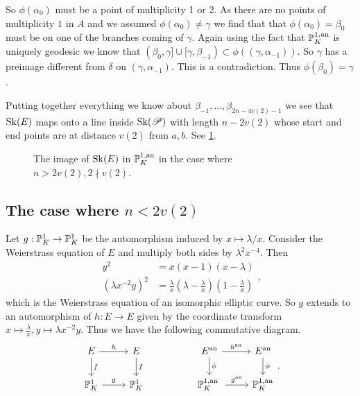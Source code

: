 So $\phi(\alpha_0)$ must be a point of multiplicity 1 or 2. As there are no points of multiplicity $1$ in $A$ and we assumed $\phi(\alpha_0)\ne \gamma$ we find that that $\phi(\alpha_0) = \beta_0$ must be on one of the branches coming of $\gamma$. 
Again using the fact that $\mathbb{P}^{1, \text{an}}_K$ is uniquely geodesic we know that $(\beta_0, \gamma] \cup [\gamma, \beta_{-1}) \subset  \phi((\gamma, \alpha_{-1}))$. 
So $\gamma$ has a preimage different from $\delta$ on $(\gamma, \alpha_{-1})$. 
This is a contradiction. 
Thus $\phi(\beta_0) = \gamma$. 

Putting together everything we know about $\beta_{-1}, \ldots, \beta_{2n - 4v(2)-1}$ we see that $\operatorname{Sk}(E)$ maps onto a line inside $\operatorname{Sk}(\mathscr P)$ with length $n- 2v(2)$ whose start and end points are at distance $v(2)$ from $a, b$.
See \cref{fig:image_between_skeleta_wild_ims}.
\begin{figure}[h]
    \centering
    \caption{The image of $\operatorname{Sk}(E)$ in  $\mathbb{P}^{1, \text{an}}_K$ in the case where $n > 2v(2), 2 \nmid v(2)$.}
    \label{fig:image_between_skeleta_wild_ims}
\end{figure}

\subsection{The case where $n < 2 v(2)$} \label{sec:the_case_where_n_<_2_v2}


Let $g: \mathbb{P}^{1}_K \to \mathbb{P}^{1}_K$ be the automorphism induced by $x \mapsto \lambda / x$. 
Consider the Weierstrass equation of $E$ and multiply both sides by $\lambda^2 x^{-4}$.
Then 
\[
\begin{aligned}
	y^2 &=  x(x-1)(x-\lambda) \\
	\left(\lambda x^{-2}y\right)^2 &= \frac{\lambda}{x}\left(\lambda - \frac{\lambda}{x} \right)\left(1 - \frac{\lambda}{x}\right)
\end{aligned}
,\] 
which is the Weierstrass equation of an isomorphic elliptic curve. 
So  $g$ extends to an automorphism of $h: E \to E$ given by the coordinate transform $x \mapsto \frac{\lambda}{x}, y\mapsto \lambda x^{-2}y$. 
Thus we have the following commutative diagram.
\[
\begin{tikzcd}
	E \rar{h} \dar{f} & E \dar{f} & & 
	E\an \rar{h\an} \dar{\phi} & E\an \dar{\phi} \\
	\pro^{1}_K \rar{g} & \pro^{1}_K & & \pro^{1, \text{an }}_K \rar{g\an} & \pro^{1, \text{an}}_K
\end{tikzcd}
.\] 

